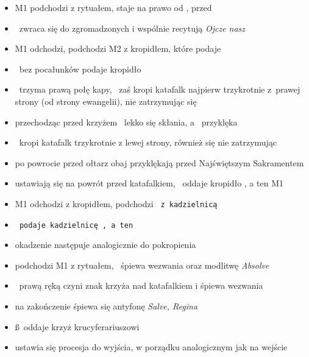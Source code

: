 \begin{itemize}
	\item M1 podchodzi z rytuałem, staje na prawo od \ii, przed \dd
	\item \ii~zwraca się do zgromadzonych i wspólnie recytują \textit{Ojcze
		nasz}
	\item M1 odchodzi, podchodzi M2 z kropidłem, które podaje \dd
	\item \dd~bez pocałunków podaje kropidło \ii
	\item \dd~trzyma prawą połę kapy, \ii~zaś kropi katafalk najpierw
		trzykrotnie z prawej strony (od strony ewangelii), nie
		zatrzymując się
	\item przechodząc przed krzyżem \ii~lekko się skłania, a \dd~przyklęka
	\item \ii~kropi katafalk trzykrotnie z lewej strony, również się nie
		zatrzymując
	\item po powrocie przed ołtarz obaj przyklękają przed Najświętszym
		Sakramentem
	\item ustawiają się na powrót przed katafalkiem, \ii~oddaje kropidło \dd, a
		ten M1
	\item M1 odchodzi z kropidłem, podchodzi \tt~z kadzielnicą
	\item \tt~podaje kadzielnicę \dd, a ten \ii
	\item okadzenie następuje analogicznie do pokropienia
	\item podchodzi M1 z rytuałem, \ii~śpiewa wezwania oraz modlitwę
		\textit{Absolve}
	\item \ii~prawą ręką czyni znak krzyża nad katafalkiem i śpiewa wezwania
	\item na zakończenie śpiewa się antyfonę \textit{Salve, Regina}
	\item \ss~oddaje krzyż krucyferariuszowi
	\item ustawia się procesja do wyjścia, w porządku analogicznym jak na
		wejście
\end{itemize}
